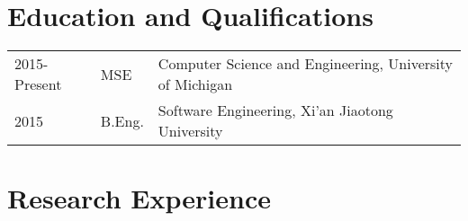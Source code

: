 \documentclass[a4paper,11pt]{article}
\begin{document}
\maketitle

\section{Education and Qualifications}

\begin{tabular}{lll}
    2015-Present   & MSE   & Computer Science and Engineering, University of Michigan \\
    2015               & B.Eng. & Software Engineering, Xi'an Jiaotong University
\end{tabular}

\section{Research Experience}
\end{document}
